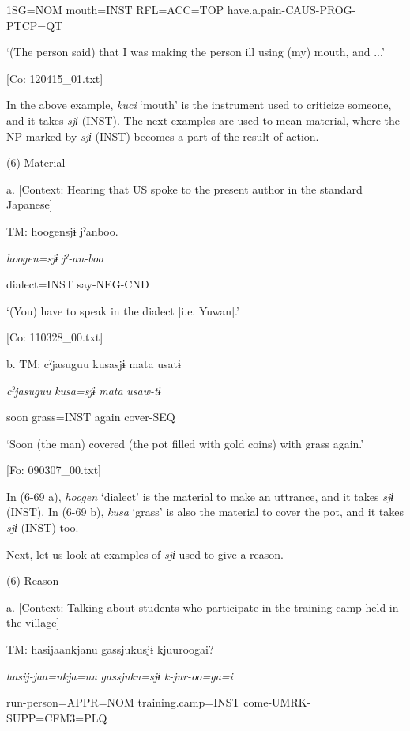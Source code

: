     1SG=NOM  mouth=INST  RFL=ACC=TOP  have.a.pain-CAUS-PROG-PTCP=QT

    ‘(The person\textit{\textsubscript{} }said) that I was making the person ill using (my) mouth, and ...’

    [Co: 120415\_01.txt]

In the above example, \textit{kuci} ‘mouth’ is the instrument used to criticize someone, and it takes \textit{sjɨ} (INST). The next examples are used to mean material, where the NP marked by \textit{sjɨ} (INST) becomes a part of the result of action.

(6)  Material

  a.  [Context: Hearing that US spoke to the present author in the standard Japanese]

    TM:  {\textbar}hoogen{\textbar}sjɨ  jˀanboo.

      \textit{hoogen=sjɨ}  \textit{jˀ-an-boo}

      dialect=INST  say-NEG-CND

      ‘(You) have to speak in the dialect [i.e. Yuwan].’

      [Co: 110328\_00.txt]

  b.  TM:  cˀjasuguu  kusasjɨ  mata  usatɨ

      \textit{cˀjasuguu}  \textit{kusa=sjɨ}  \textit{mata}  \textit{usaw-tɨ}

      soon  grass=INST  again  cover-SEQ

      ‘Soon (the man) covered (the pot filled with gold coins) with grass again.’

      [Fo: 090307\_00.txt]

In (6-69 a), \textit{hoogen} ‘dialect’ is the material to make an uttrance, and it takes \textit{sjɨ} (INST). In (6-69 b), \textit{kusa} ‘grass’ is also the material to cover the pot, and it takes \textit{sjɨ} (INST) too.

Next, let us look at examples of \textit{sjɨ} used to give a reason.

(6)  Reason

  a.  [Context: Talking about students who participate in the training camp held in the village]

    TM:  hasijaankjanu  {\textbar}gassjuku{\textbar}sjɨ  kjuuroogai?

      \textit{hasij-jaa=nkja=nu}  \textit{gassjuku=sjɨ}  \textit{k-jur-oo=ga=i}

      run-person=APPR=NOM  training.camp=INST  come-UMRK-SUPP=CFM3=PLQ

